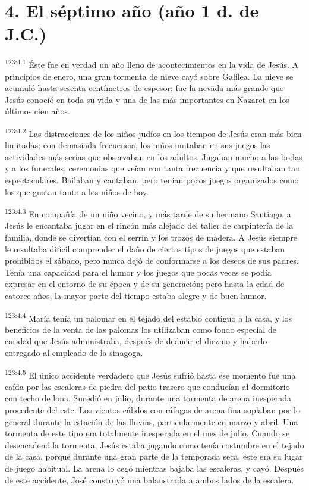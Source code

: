 \section*{4. El séptimo año (año 1 d. de J.C.)}
\par 
\textsuperscript{123:4.1} Éste fue en verdad un año lleno de acontecimientos en la vida de Jesús. A principios de enero, una gran tormenta de nieve cayó sobre Galilea. La nieve se acumuló hasta sesenta centímetros de espesor; fue la nevada más grande que Jesús conoció en toda su vida y una de las más importantes en Nazaret en los últimos cien años.

\par 
\textsuperscript{123:4.2} Las distracciones de los niños judíos en los tiempos de Jesús eran más bien limitadas; con demasiada frecuencia, los niños imitaban en sus juegos las actividades más serias que observaban en los adultos. Jugaban mucho a las bodas y a los funerales, ceremonias que veían con tanta frecuencia y que resultaban tan espectaculares. Bailaban y cantaban, pero tenían pocos juegos organizados como los que gustan tanto a los niños de hoy.

\par 
\textsuperscript{123:4.3} En compañía de un niño vecino, y más tarde de su hermano Santiago, a Jesús le encantaba jugar en el rincón más alejado del taller de carpintería de la familia, donde se divertían con el serrín y los trozos de madera. A Jesús siempre le resultaba difícil comprender el daño de ciertos tipos de juegos que estaban prohibidos el sábado, pero nunca dejó de conformarse a los deseos de sus padres. Tenía una capacidad para el humor y los juegos que pocas veces se podía expresar en el entorno de su época y de su generación; pero hasta la edad de catorce años, la mayor parte del tiempo estaba alegre y de buen humor.

\par 
\textsuperscript{123:4.4} María tenía un palomar en el tejado del establo contiguo a la casa, y los beneficios de la venta de las palomas los utilizaban como fondo especial de caridad que Jesús administraba, después de deducir el diezmo y haberlo entregado al empleado de la sinagoga.

\par 
\textsuperscript{123:4.5} El único accidente verdadero que Jesús sufrió hasta ese momento fue una caída por las escaleras de piedra del patio trasero que conducían al dormitorio con techo de lona. Sucedió en julio, durante una tormenta de arena inesperada procedente del este. Los vientos cálidos con ráfagas de arena fina soplaban por lo general durante la estación de las lluvias, particularmente en marzo y abril. Una tormenta de este tipo era totalmente inesperada en el mes de julio. Cuando se desencadenó la tormenta, Jesús estaba jugando como tenía costumbre en el tejado de la casa, porque durante una gran parte de la temporada seca, éste era su lugar de juego habitual. La arena lo cegó mientras bajaba las escaleras, y cayó. Después de este accidente, José construyó una balaustrada a ambos lados de la escalera.

